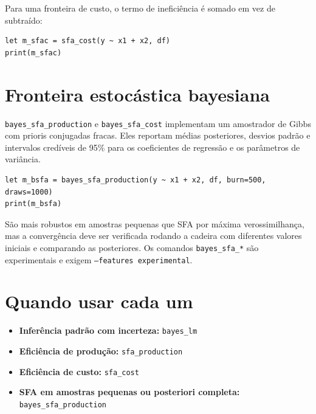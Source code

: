 Para uma fronteira de custo, o termo de ineficiência é somado em vez de
subtraído:

\begin{lstlisting}[caption={Fronteira de custo estocástica}]
let m_sfac = sfa_cost(y ~ x1 + x2, df)
print(m_sfac)
\end{lstlisting}

\section{Fronteira estocástica bayesiana}

\texttt{bayes\_sfa\_production} e \texttt{bayes\_sfa\_cost} implementam um amostrador de
Gibbs com prioris conjugadas fracas. Eles reportam médias posteriores,
desvios padrão e intervalos credíveis de 95\% para os coeficientes de
regressão e os parâmetros de variância.

\begin{lstlisting}[caption={SFA bayesiano}]
let m_bsfa = bayes_sfa_production(y ~ x1 + x2, df, burn=500, draws=1000)
print(m_bsfa)
\end{lstlisting}

São mais robustos em amostras pequenas que SFA por máxima
verossimilhança, mas a convergência deve ser verificada rodando a
cadeira com diferentes valores iniciais e comparando as posteriores.
Os comandos \texttt{bayes\_sfa\_*} são experimentais e exigem
\texttt{--features experimental}.

\section{Quando usar cada um}

\begin{itemize}
\item \textbf{Inferência padrão com incerteza:} \texttt{bayes\_lm}
\item \textbf{Eficiência de produção:} \texttt{sfa\_production}
\item \textbf{Eficiência de custo:} \texttt{sfa\_cost}
\item \textbf{SFA em amostras pequenas ou posteriori completa:} \texttt{bayes\_sfa\_production}
\end{itemize}
